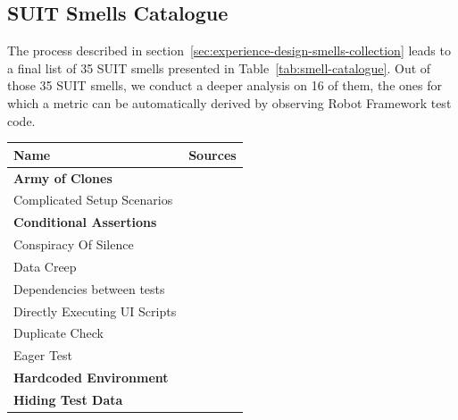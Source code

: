\subsection{SUIT Smells Catalogue}
\label{sec:results-smells-catalogue}

The process described in section~\ref{sec:experience-design-smells-collection} leads to a final list of 35 SUIT smells presented in Table~\ref{tab:smell-catalogue}. Out of those 35 SUIT smells, we conduct a deeper analysis on 16 of them, the ones for which a metric can be automatically derived by observing Robot Framework test code.

\begin{table}
\centering

\begin{tabularx}{\textwidth}{>{\raggedright}p{1.5in}>{\raggedright}p{4in}}

\hline
\textbf{Name} & \textbf{Sources}\tabularnewline
\hline

\scriptsize{\textbf{Army of Clones}} & \scriptsize{\cite{Chen2012, Hauptmann2013, Hauptmann2015, Jones2019}} \tabularnewline 


\scriptsize{Complicated Setup Scenarios} & \scriptsize{\cite{Scott2015}} \tabularnewline 

\scriptsize{\textbf{Conditional Assertions}} & \scriptsize{\cite{Gawinecki2016}} \tabularnewline 

\scriptsize{Conspiracy Of Silence} & \scriptsize{\cite{Gawinecki2016, Sheth2020}} \tabularnewline 

\scriptsize{Data Creep} & \scriptsize{\cite{Alegroth2016b, Siminiuc2019, Shay2019}} \tabularnewline 

\scriptsize{Dependencies between tests} & \scriptsize{\cite{Klarck2014, Advolodkin2018, Cripsin2018, Bushnev2019, Goldberg2019}} \tabularnewline 

\scriptsize{Directly Executing UI Scripts} & \scriptsize{\cite{Scott2015}} \tabularnewline 

\scriptsize{Duplicate Check} & \scriptsize{\cite{Buwalda2019}} \tabularnewline 

\scriptsize{Eager Test} &  \scriptsize{\cite{England2016, Renaudin2016, Cripsin2018, Sciamanna2019, Temov2020}} \tabularnewline 

\scriptsize{\textbf{Hardcoded Environment}} & \scriptsize{\cite{Gawinecki2016, Sheth2020}} \tabularnewline 

\scriptsize{\textbf{Hiding Test Data}} & \scriptsize{\cite{Jain2007}} \tabularnewline 


\end{tabularx}
\end{table}
